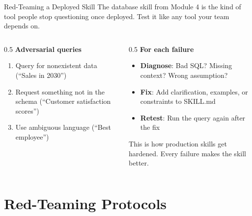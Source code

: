 \documentclass[aspectratio=169]{beamer}
\begin{document}
\begin{frame}{Red-Teaming a Deployed Skill}
The database skill from Module 4 is the kind of tool people \alert{stop questioning} once deployed. Test it like any tool your team depends on.
\vspace{0.3cm}
\begin{columns}[T]
\begin{column}{0.5\textwidth}
\textbf{Adversarial queries}
\begin{enumerate}\small
  \item Query for nonexistent data (``Sales in 2030'')
  \item Request something not in the schema (``Customer satisfaction scores'')
  \item Use ambiguous language (``Best employee'')
\end{enumerate}
\end{column}
\begin{column}{0.5\textwidth}
\textbf{For each failure}
\begin{itemize}\small
  \item \textbf{Diagnose}: Bad SQL? Missing context? Wrong assumption?
  \item \textbf{Fix}: Add clarification, examples, or constraints to SKILL.md
  \item \textbf{Retest}: Run the query again after the fix
\end{itemize}
\vspace{0.3cm}
This is how production skills get hardened. \alert{Every failure makes the skill better.}
\end{column}
\end{columns}
\end{frame}

\section{Red-Teaming Protocols}
\end{document}
